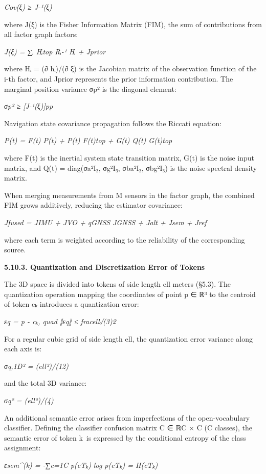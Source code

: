 \documentclass[
]{article}
\begin{document}
\emph{Cov(ξ) ≥ J-¹(ξ)}

where J(ξ) is the Fisher Information Matrix (FIM), the sum of
contributions from all factor graph factors:

\emph{J(ξ) = ∑ᵢ Hᵢtop Rᵢ-¹ Hᵢ + Jprior}

where Hᵢ = (∂ hᵢ)/(∂ ξ) is the Jacobian matrix of the observation
function of the i-th factor, and Jprior represents the prior information
contribution. The marginal position variance σp² is the diagonal
element:

\emph{σp² ≥ {[}J-¹(ξ){]}pp}

Navigation state covariance propagation follows the Riccati equation:

\emph{P(t) = F(t) P(t) + P(t) F(t)top + G(t) Q(t) G(t)top}

where F(t) is the inertial system state transition matrix, G(t) is the
noise input matrix, and Q(t) = diag(σa²I₃, σg²I₃, σba²I₃, σbg²I₃) is the
noise spectral density matrix.

When merging measurements from M sensors in the factor graph, the
combined FIM grows additively, reducing the estimator covariance:

\emph{Jfused = JIMU + JVO + qGNSS JGNSS + Jalt + Jsem + Jref}

where each term is weighted according to the reliability of the
corresponding source.

\textbf{5.10.3. Quantization and Discretization Error of Tokens}

The 3D space is divided into tokens of side length ell meters (§5.3).
The quantization operation mapping the coordinates of point p ∈ ℝ³ to
the centroid of token cₖ introduces a quantization error:

\emph{εq = p - cₖ, quad ‖εq‖ ≤ fracell√(3)2}

For a regular cubic grid of side length ell, the quantization error
variance along each axis is:

\emph{σq,1D² = (ell²)/(12)}

and the total 3D variance:

\emph{σq² = (ell²)/(4)}

An additional semantic error arises from imperfections of the
open-vocabulary classifier. Defining the classifier confusion matrix C ∈
ℝC × C (C classes), the semantic error of token k~is expressed by the
conditional entropy of the class assignment:

\emph{εsem\^{}(k) = -∑c=1C p(c\textbar Tₖ) log p(c\textbar Tₖ) =
H(c\textbar Tₖ)}
\end{document}
